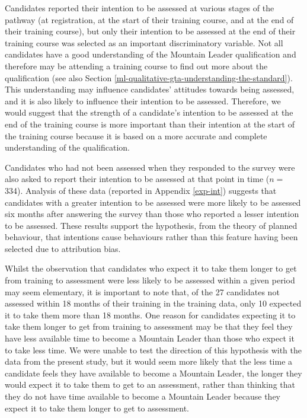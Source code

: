 \documentclass[
  12pt,
  a4paper,
]{book}
\begin{document}
Candidates reported their intention to be assessed at various stages of the pathway (at registration, at the start of their training course, and at the end of their training course), but only their intention to be assessed at the end of their training course was selected as an important discriminatory variable. Not all candidates have a good understanding of the Mountain Leader qualification and therefore may be attending a training course to find out more about the qualification (see also Section \ref{ml-qualitative-gta-understanding-the-standard}). This understanding may influence candidates' attitudes towards being assessed, and it is also likely to influence their intention to be assessed. Therefore, we would suggest that the strength of a candidate's intention to be assessed at the end of the training course is more important than their intention at the start of the training course because it is based on a more accurate and complete understanding of the qualification.

Candidates who had not been assessed when they responded to the survey were also asked to report their intention to be assessed at that point in time (\(n =\) 334). Analysis of these data (reported in Appendix \ref{exp-int}) suggests that candidates with a greater intention to be assessed were more likely to be assessed six months after answering the survey than those who reported a lesser intention to be assessed. These results support the hypothesis, from the theory of planned behaviour, that intentions cause behaviours rather than this feature having been selected due to attribution bias.

Whilst the observation that candidates who expect it to take them longer to get from training to assessment were less likely to be assessed within a given period may seem elementary, it is important to note that, of the 27 candidates not assessed within 18 months of their training in the training data, only 10 expected it to take them more than 18 months. One reason for candidates expecting it to take them longer to get from training to assessment may be that they feel they have less available time to become a Mountain Leader than those who expect it to take less time. We were unable to test the direction of this hypothesis with the data from the present study, but it would seem more likely that the less time a candidate feels they have available to become a Mountain Leader, the longer they would expect it to take them to get to an assessment, rather than thinking that they do not have time available to become a Mountain Leader because they expect it to take them longer to get to assessment.
\end{document}
